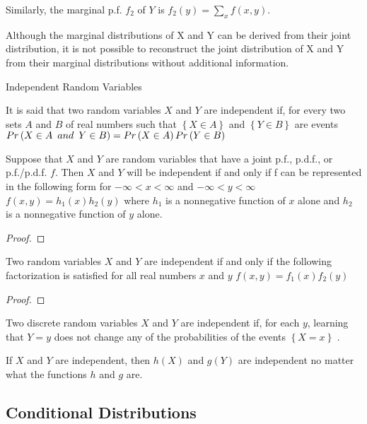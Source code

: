 {\color{red} Similarly, the marginal p.f. $f_{2}$ of $Y$ is $f_{2} \left(y\right)=\sum_{x}f\left(x,y\right)$.}

{\color{red} Although the marginal distributions of X and Y can be derived from their joint distribution, it is not possible to reconstruct the joint distribution of X and Y from their marginal distributions without additional information.}

{\color{red} Independent Random Variables}

\begin{definition}
It is said that two random variables $X$ and $Y$ are independent if, for every two sets $A$ and $B$ of real numbers such that $\left\{ X\in A\right\}$ and $\left\{ Y\in B\right\}$ are events $Pr\left(X\in A\enskip and\enskip Y\in B\right)=Pr\left(X\in A\right)Pr\left(Y\in B\right)$
\end{definition}

\begin{proposition}
Suppose that $X$ and $Y$ are random variables that have a joint p.f., p.d.f., or p.f./p.d.f. $f$. Then $X$ and $Y$ will be independent if and only if f can be represented in the following form for $-\infty<x<\infty$ and $-\infty<y<\infty$ $f\left(x,y\right)=h_{1}\left(x\right)h_{2}\left(y\right)$ where $h_{1}$ is a nonnegative function of $x$ alone and $h_{2}$ is a nonnegative function of $y$ alone.
\end{proposition}
\begin{proof}
\end{proof}

\begin{corollary}
Two random variables $X$ and $Y$ are independent if and only if the following factorization is satisfied for all real numbers $x$ and $y$ $f\left(x,y\right)=f_{1}\left(x\right)f_{2}\left(y\right)$
\end{corollary}
\begin{proof}
\end{proof}

{\color{red} Two discrete random variables $X$ and $Y$ are independent if, for each $y$, learning that $Y=y$ does not change any of the probabilities of the events $\left\{ X=x\right\}$ .}

{\color{red} If $X$ and $Y$ are independent, then $h\left(X\right)$ and $g\left(Y\right)$ are independent no matter what the functions $h$ and $g$ are.}


\subsection{Conditional Distributions}

